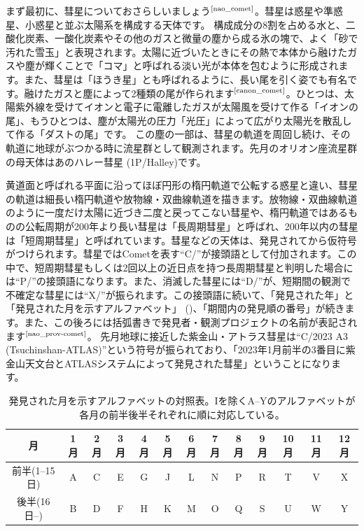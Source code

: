 \documentclass[../../super_nova_2024]{subfiles}
\begin{document}
まず最初に、彗星についておさらしいましょう$^\text{\cite{nao_comet}}$。彗星は惑星や準惑星、小惑星と並ぶ太陽系を構成する天体です。
構成成分の8割を占める水と、二酸化炭素、一酸化炭素やその他のガスと微量の塵から成る氷の塊で、よく「砂で汚れた雪玉」と表現されます。太陽に近づいたときにその熱で本体から融けたガスや塵が輝くことで「コマ」と呼ばれる淡い光が本体を包むように形成されます。また、彗星は「ほうき星」とも呼ばれるように、長い尾を引く姿でも有名です。融けたガスと塵によって2種類の尾が作られます$^\text{\cite{canon_comet}}$。ひとつは、太陽紫外線を受けてイオンと電子に電離したガスが太陽風を受けて作る「イオンの尾」、もうひとつは、塵が太陽光の圧力「光圧」によって広がり太陽光を散乱して作る「ダストの尾」です。
この塵の一部は、彗星の軌道を周回し続け、その軌道に地球がぶつかる時に流星群として観測されます。先月のオリオン座流星群の母天体はあのハレー彗星 (1P/Halley)です。

黄道面と呼ばれる平面に沿ってほぼ円形の楕円軌道で公転する惑星と違い、彗星の軌道は細長い楕円軌道や放物線・双曲線軌道を描きます。放物線・双曲線軌道のように一度だけ太陽に近づき二度と戻ってこない彗星や、楕円軌道ではあるものの公転周期が200年より長い彗星は「長周期彗星」と呼ばれ、200年以内の彗星は「短周期彗星」と呼ばれています。彗星などの天体は、発見されてから仮符号がつけられます。彗星ではCometを表す``C/''が接頭語として付加されます。この中で、短周期彗星もしくは2回以上の近日点を持つ長周期彗星と判明した場合には``P/''の接頭語になります。また、消滅した彗星には``D/''が、短期間の観測で不確定な彗星には``X/''が振られます。この接頭語に続いて、「発見された年」と「発見された月を示すアルファベット」 ()、「期間内の発見順の番号」が続きます。また、この後ろには括弧書きで発見者・観測プロジェクトの名前が表記されます$^\text{\cite{nao_prov-comet}}$。
先月地球に接近した紫金山・アトラス彗星は``C/2023 A3 (Tsuchinshan-ATLAS)''という符号が振られており、「2023年1月前半の3番目に紫金山天文台とATLASシステムによって発見された彗星」ということになります。

\begin{table}
  \small
    \centering
    \caption{発見された月を示すアルファベットの対照表。Iを除くA--Yのアルファベットが各月の前半後半それぞれに順に対応している。}
    \label{tab:alphabet}
    \begin{tabular}{c|cccccccccccc}\hline
        月 & 1月 & 2月 & 3月 & 4月 & 5月 & 6月 & 7月 & 8月 & 9月 & 10月 & 11月 & 12月 \\
        \hline
        前半(1--15日) & A & C & E & G & J & L & N & P & R & T & V & X \\
        後半(16日--) & B & D & F & H & K & M & O & Q & S & U & W & Y \\
        \hline
    \end{tabular}
\end{table}
\end{document}
